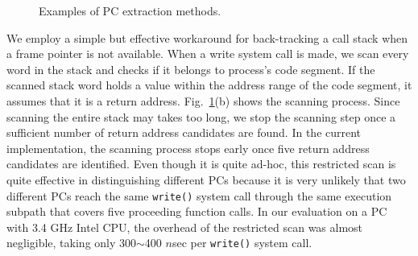 \begin{figure}[t]
	\centering
	\caption{Examples of PC extraction methods.}
	\label{fig:getpc}
	\vspace{-15pt}
\end{figure}

We employ a simple but effective workaround for back-tracking a call stack when
a frame pointer is not available.  When a write system call is made,
we scan every word in the stack
and checks if it belongs to process's code segment.  If the scanned stack word
holds a value within the address range of the code segment, it assumes that it
is a return address.  
Fig.~\ref{fig:getpc}(b) shows the scanning process.
Since scanning the entire stack may takes too long, we stop
the scanning step once a sufficient number of return address candidates are found.
In the current implementation, the scanning process stops early once 
five return address candidates are identified.  
Even though it is quite ad-hoc, this restricted scan is quite effective
in distinguishing different PCs because it is very unlikely that two different PCs
reach the same \texttt{write()} system call through the same execution subpath 
that covers five proceeding function calls. 
In our evaluation on a PC with 3.4 GHz Intel CPU, the overhead of the
restricted scan was almost negligible, taking only 300$\sim$400 $n$sec per
\texttt{write()} system call.

